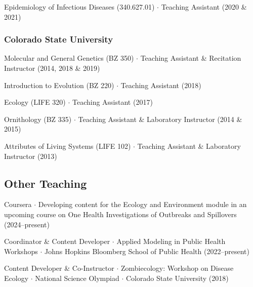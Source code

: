\documentclass{cv}
\begin{document}
Epidemiology of Infectious Diseases (340.627.01) $\cdot$ Teaching Assistant (2020 \& 2021)

\subsubsection*{Colorado State University}

Molecular and General Genetics (BZ 350) $\cdot$ Teaching Assistant \& Recitation Instructor (2014, 2018 \& 2019)

Introduction to Evolution (BZ 220) $\cdot$ Teaching Assistant (2018)

Ecology (LIFE 320) $\cdot$ Teaching Assistant (2017)

Ornithology (BZ 335) $\cdot$ Teaching Assistant \& Laboratory Instructor (2014 \& 2015)

Attributes of Living Systems (LIFE 102) $\cdot$ Teaching Assistant \& Laboratory Instructor (2013)

\subsection*{Other Teaching}

Coursera $\cdot$ Developing content for the Ecology and Environment module in an upcoming course on One Health Investigations of Outbreaks and Spillovers (2024--present)

Coordinator \& Content Developer $\cdot$ Applied Modeling in Public Health Workshops $\cdot$ Johns Hopkins Bloomberg School of Public Health (2022--present)

Content Developer \& Co-Instructor $\cdot$ Zombiecology: Workshop on Disease Ecology $\cdot$ National Science Olympiad $\cdot$ Colorado State University (2018)




\end{document}
